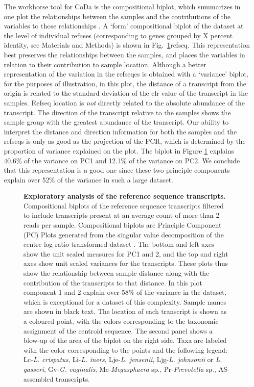 \documentclass[10pt,letterpaper]{article}
\begin{document}
The workhorse tool for CoDa is the compositional biplot, which summarizes in one plot the relationships between the samples and the contributions of the variables to those relationships \cite{aitchison2002biplots}. A `form' compositional biplot of the dataset at the level of individual refuses (corresponding to genes grouped by X percent identity, see Materials and Methods) is shown in Fig.~\ref{F1:refseq_biplot}refseq. This representation best preserves the relationships between the samples, and places the variables in relation to their contribution to sample location. Although a better representation of the variation in the refseqes is obtained with a `variance' biplot, for the purposes of illustration, in this plot, the distance of a transcript from the origin is  related to the standard deviation of the clr value of the transcript in the samples. Refseq location is \emph{not} directly related to the absolute abundance of the transcript. The direction of the transcript relative to the samples shows the sample group with the greatest abundance of the transcript. Our ability to interpret the distance and direction information for both the samples and the refseqs is only as good as the projection of the PCR, which is determined by the proportion of variance explained on the plot. The biplot in Figure \ref{F1:refseq_biplot} explains 40.6\% of the variance on PC1 and 12.1\% of the variance on PC2. We conclude that this representation is a good one since these two principle components explain over 52\% of the variance in such a large dataset.

\begin{figure}[h]
\caption{{\bf Exploratory analysis of the reference sequence transcripts.}
Compositional biplots of the reference sequence transcripts filtered to include transcripts present at an average count of more than 2 reads per sample. Compositional biplots are Principle Component (PC) Plots generated from the singular value decomposition of the centre log-ratio transformed dataset \cite{aitchison2002biplots}. The bottom and left axes show the unit scaled measures for PC1 and 2, and the top and right axes show unit scaled variances for the transcripts. These plots thus show the relationship between sample distance along with the contribution of the transcripts to that distance. In this plot component 1 and 2 explain over 58\% of the variance in the dataset, which is exceptional for a dataset of this complexity. Sample names are shown in black text. The location of each transcript is shown as a coloured point, with the colors corresponding to the taxonomic assignment of the centroid sequence. The second panel shows a blow-up of the area of the biplot on the right side. Taxa are labeled with the  color corresponding to the points and the following legend: Lc-\emph{L. crispatus},  Li-\emph{L. iners},  Lje-\emph{L. jensenii}, Ljg-\emph{L. johnsonii} or \emph{L. gasseri}, Gv-\emph{G. vaginalis}, Me-\emph{Megasphaera} sp., Pr-\emph{Prevotella} sp., AS- assembled transcripts. }
\label{F1:refseq_biplot}
\end{figure}
\end{document}
